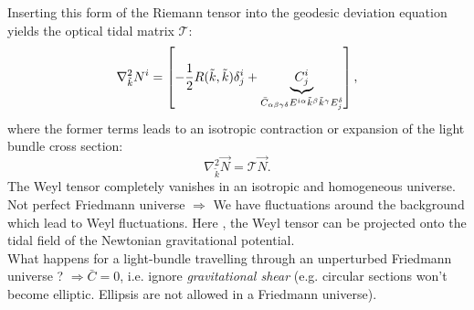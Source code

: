 Inserting this form of the Riemann tensor into the geodesic deviation equation yields the optical tidal matrix $\mathcal{T}$:
\begin{equation}
\nabla^2_{\tilde{k}} N^i = \left[-\frac{1}{2} R(\tilde{k},\tilde{k})\delta^i_j + \underbrace{C^i_j}_{\bar{C}_{\alpha \beta \gamma \delta} E^{i\alpha} \tilde{k}^{\beta} \tilde{k}^{\gamma} E^{\delta}_j} \right],
\end{equation}
where the former terms leads to an isotropic contraction or expansion of the light bundle cross section:
\begin{equation}
\nabla^2_{\tilde{k}} \vec{N} = \mathcal{T} \vec{N}.
\end{equation}
The Weyl tensor completely vanishes in an isotropic and homogeneous universe. Not perfect Friedmann universe $\Rightarrow$ We have fluctuations around the background which lead to Weyl fluctuations. Here , the Weyl tensor can be projected onto the tidal field of the Newtonian gravitational potential.\\
What happens for a light-bundle travelling through an unperturbed Friedmann universe ? $\Rightarrow \bar{C}=0$, i.e. ignore \emph{gravitational shear} (e.g. circular sections won't become elliptic. Ellipsis are not allowed in a Friedmann universe).
